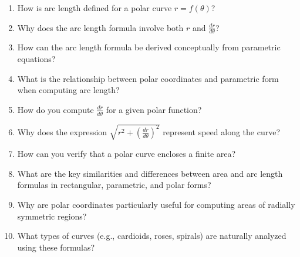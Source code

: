 \begin{enumerate}
\item How is arc length defined for a polar curve $r = f(\theta)$?

\item Why does the arc length formula involve both $r$ and $\frac{dr}{d\theta}$?

\item How can the arc length formula be derived conceptually from parametric equations?

\item What is the relationship between polar coordinates and parametric form when computing arc length?

\item How do you compute $\frac{dr}{d\theta}$ for a given polar function?

\item Why does the expression $\sqrt{r^2 + \left(\frac{dr}{d\theta}\right)^2}$ represent speed along the curve?

\item How can you verify that a polar curve encloses a finite area?

\item What are the key similarities and differences between area and arc length formulas in rectangular, parametric, and polar forms?

\item Why are polar coordinates particularly useful for computing areas of radially symmetric regions?

\item What types of curves (e.g., cardioids, roses, spirals) are naturally analyzed using these formulas?

\end{enumerate}
